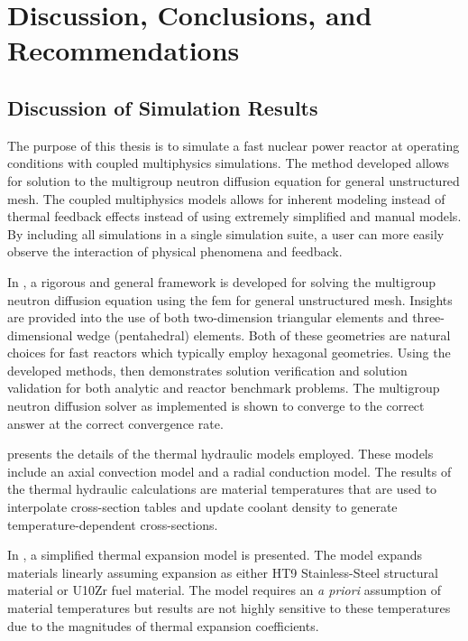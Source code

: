 \chapter{Discussion, Conclusions, and Recommendations}
\label{ch:conclusions}

\section{Discussion of Simulation Results}

  The purpose of this thesis is to simulate a fast nuclear power reactor at 
  operating conditions with coupled multiphysics simulations. The method
  developed allows for solution to the multigroup neutron diffusion equation for
  general unstructured mesh. The coupled multiphysics models allows for inherent
  modeling instead of thermal feedback effects instead of using extremely
  simplified and manual models. By including all simulations in a single
  simulation suite, a user can more easily observe the interaction of 
  physical phenomena and feedback.

  In , a rigorous and general framework is developed
  for solving the multigroup neutron diffusion equation using the \gls{fem} for
  general unstructured mesh. Insights are provided into the use of both
  two-dimension triangular elements and three-dimensional wedge (pentahedral)
  elements. Both of these geometries are natural choices for fast reactors which 
  typically employ hexagonal geometries. Using the developed methods,
   then demonstrates solution verification and
  solution validation for both analytic and reactor benchmark problems. The
  multigroup neutron diffusion solver as implemented is shown to converge to the
  correct answer at the correct convergence rate.

   presents the details of the thermal hydraulic
  models employed. These models include an axial convection model and a radial
  conduction model. The results of the thermal hydraulic calculations are
  material temperatures that are used to interpolate cross-section tables and
  update coolant density to generate temperature-dependent cross-sections.

  In , a simplified thermal expansion model is
  presented. The model expands materials linearly assuming expansion as either
  HT9 Stainless-Steel structural material or U10Zr fuel material. The model
  requires an \textit{a priori} assumption of material temperatures but results
  are not highly sensitive to these temperatures due to the magnitudes of
  thermal expansion coefficients.

